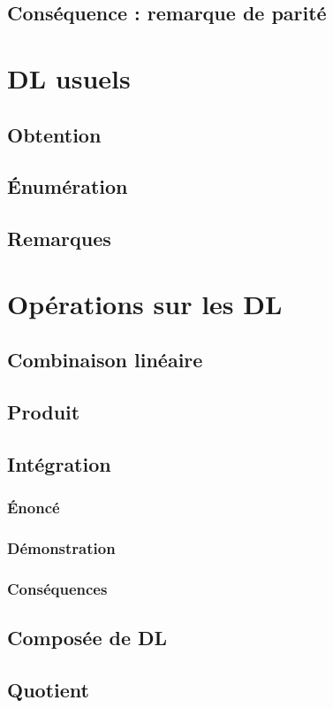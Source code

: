 \documentclass[12pt,a4paper,french]{book}
\begin{document}
		\subsection{Conséquence : remarque de parité}
	\section{DL usuels}
		\subsection{Obtention}
		\subsection{Énumération}
		\subsection{Remarques}
	\section{Opérations sur les DL}
		\subsection{Combinaison linéaire}
		\subsection{Produit}
		\subsection{Intégration}
			\subsubsection{Énoncé}
			\subsubsection{Démonstration}
			\subsubsection{Conséquences}
		\subsection{Composée de DL}
		\subsection{Quotient}
		
\end{document}
